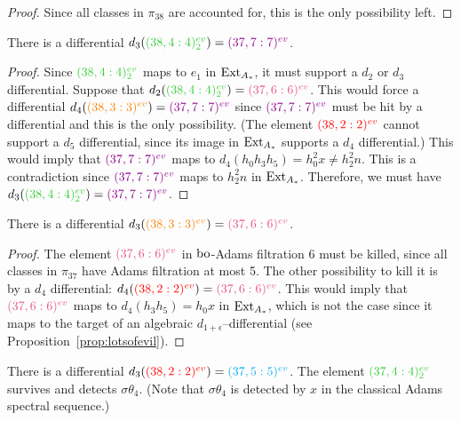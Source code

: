\begin{proof}
Since all classes in $\pi_{38}$ are accounted for, this is the only possibility left.
\end{proof}

\begin{prop}There is a differential
$d_3(\evrm{38}{4}{limegreen}{2}) = \evr{37}{7}{darkmagenta}$.
\end{prop}

\begin{proof}
Since $\evrm{38}{4}{limegreen}{2}$ maps to $e_1$ in $\Ex$, it must support a $d_2$ or $d_3$ differential. Suppose that $d_2(\evrm{38}{4}{limegreen}{2}) =\evr{37}{6}{lavenderrose}$. This would force a differential $d_4(\evr{38}{3}{orange}) = \evr{37}{7}{darkmagenta}$ since $\evr{37}{7}{darkmagenta}$ must be hit by a differential and this is the only possibility. (The element $\evr{38}{2}{red}$ cannot support a $d_5$ differential, since its image in $\Ex$ supports a $d_4$ differential.) This would imply that $\evr{37}{7}{darkmagenta}$ maps to $ d_4(h_0h_3h_5) = h_0^2x \neq h_2^2n$. This is a contradiction since $\evr{37}{7}{darkmagenta}$ maps to $h_2^2n$ in $\Ex$. Therefore, we must have $d_3(\evrm{38}{4}{limegreen}{2}) = \evr{37}{7}{darkmagenta}$.
\end{proof}

\begin{prop}There is a differential
$d_3(\evr{38}{3}{orange}) = \evr{37}{6}{lavenderrose}$.
\end{prop}

\begin{proof}
The element $\evr{37}{6}{lavenderrose}$ in $\bo$-Adams filtration 6 must be killed, since all classes in $\pi_{37}$ have Adams filtration at most 5. The other possibility to kill it is by a $d_4$ differential: $d_4(\evr{38}{2}{red}) = \evr{37}{6}{lavenderrose}$. This would imply that $\evr{37}{6}{lavenderrose}$ maps to $d_4(h_3h_5) = h_0x$ in $\Ex$, which is not the case since it maps to the target of an algebraic $d_{1+\epsilon}$--differential (see Proposition~\ref{prop:lotsofevil}).
\end{proof}

\begin{prop}There is a differential
$d_3(\evr{38}{2}{red}) = \evr{37}{5}{cyan}$. The element $\evrm{37}{4}{limegreen}{2}$ survives and detects $\sigma\theta_4$. (Note that $\sigma\theta_4$ is detected by $x$ in the classical Adams spectral sequence.)
\end{prop}

